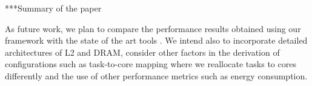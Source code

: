 \label{sec:conclusion}

***Summary of the paper

As future work, we plan to compare the performance results obtained using our framework with the state of the art tools \cite{6280389,10.1109/MS.2005.102}. We intend also to incorporate detailed architectures of L2 and DRAM, consider other factors in the derivation of configurations such as task-to-core mapping where we reallocate tasks to cores differently and the use of other performance metrics such as energy consumption. 